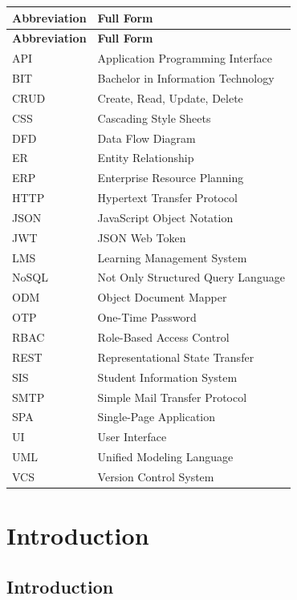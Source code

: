 \documentclass[12pt,a4paper]{report}
\begin{document}
\begin{longtable}{p{3cm}p{10.5cm}}
\textbf{Abbreviation} & \textbf{Full Form} \\[4pt]
\endfirsthead
\textbf{Abbreviation} & \textbf{Full Form} \\[4pt]
\endhead
API & Application Programming Interface \\
BIT & Bachelor in Information Technology \\
CRUD & Create, Read, Update, Delete \\
CSS & Cascading Style Sheets \\
DFD & Data Flow Diagram \\
ER & Entity Relationship \\
ERP & Enterprise Resource Planning \\
HTTP & Hypertext Transfer Protocol \\
JSON & JavaScript Object Notation \\
JWT & JSON Web Token \\
LMS & Learning Management System \\
NoSQL & Not Only Structured Query Language \\
ODM & Object Document Mapper \\
OTP & One-Time Password \\
RBAC & Role-Based Access Control \\
REST & Representational State Transfer \\
SIS & Student Information System \\
SMTP & Simple Mail Transfer Protocol \\
SPA & Single-Page Application \\
UI & User Interface \\
UML & Unified Modeling Language \\
VCS & Version Control System \\
\end{longtable}

\clearpage
{}

\chapter{Introduction}

\section{Introduction}
\end{document}
